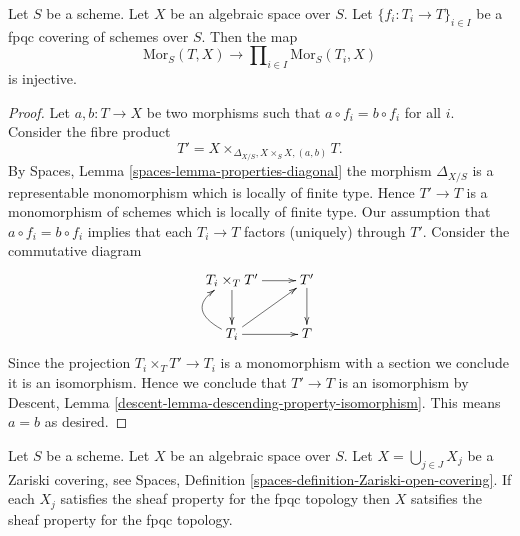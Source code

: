 \begin{lemma}
\label{lemma-separated-fpqc}
Let $S$ be a scheme.
Let $X$ be an algebraic space over $S$.
Let $\{f_i : T_i \to T\}_{i \in I}$ be a fpqc covering of schemes over $S$.
Then the map
$$
\text{Mor}_S(T, X)
\longrightarrow
\prod\nolimits_{i \in I} \text{Mor}_S(T_i, X)
$$
is injective.
\end{lemma}

\begin{proof}
Let $a, b : T \to X$ be two morphisms such that $a \circ f_i = b \circ f_i$
for all $i$. Consider the fibre product
$$
T' = X \times_{\Delta_{X/S}, X \times_S X, (a, b)} T.
$$
By
Spaces, Lemma \ref{spaces-lemma-properties-diagonal}
the morphism $\Delta_{X/S}$ is a representable monomorphism which is
locally of finite type. Hence $T' \to T$ is a monomorphism of schemes which
is locally of finite type. Our assumption that $a \circ f_i = b \circ f_i$
implies that each $T_i \to T$ factors (uniquely) through $T'$. Consider
the commutative diagram
$$
\xymatrix{
T_i \times_T T' \ar[r] \ar[d] & T' \ar[d] \\
T_i \ar[r] \ar@/^5ex/[u] \ar[ru] & T
}
$$
Since the projection $T_i \times_T T' \to T_i$ is a monomorphism
with a section we conclude it is an isomorphism. Hence we conclude that
$T' \to T$ is an isomorphism by
Descent, Lemma \ref{descent-lemma-descending-property-isomorphism}.
This means $a = b$ as desired.
\end{proof}

\begin{lemma}
\label{lemma-sheaf-fpqc-open-covering}
Let $S$ be a scheme.
Let $X$ be an algebraic space over $S$.
Let $X = \bigcup_{j \in J} X_j$ be a Zariski covering, see
Spaces, Definition \ref{spaces-definition-Zariski-open-covering}.
If each $X_j$ satisfies the sheaf property for the fpqc topology
then $X$ satsifies the sheaf property for the fpqc topology.
\end{lemma}

